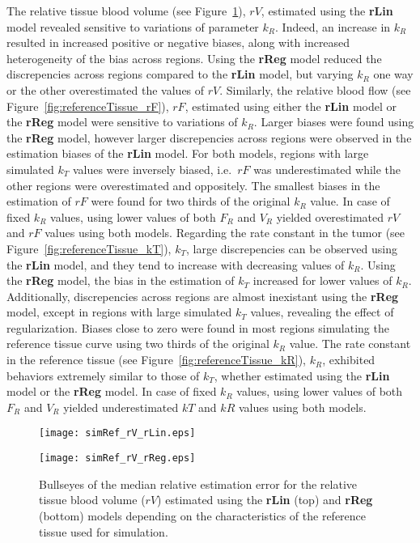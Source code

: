 The relative tissue blood volume (see Figure~\ref{fig:referenceTissue_rV}), $rV$, estimated using the \textbf{rLin} model revealed sensitive to variations of parameter $k_R$.
Indeed, an increase in $k_R$ resulted in increased positive or negative biases, along with increased heterogeneity of the bias across regions.
Using the \textbf{rReg} model reduced the discrepencies across regions compared to the \textbf{rLin} model, but varying $k_R$ one way or the other overestimated the values of $rV$.
Similarly, the relative blood flow (see Figure~\ref{fig:referenceTissue_rF}), $rF$, estimated using either the \textbf{rLin} model or the \textbf{rReg} model were sensitive to variations of $k_R$. 
Larger biases were found using the \textbf{rReg} model, however larger discrepencies across regions were observed in the estimation biases of the \textbf{rLin} model.
For both models, regions with large simulated $k_T$ values were inversely biased, i.e.~$rF$ was underestimated while the other regions were overestimated and oppositely.
The smallest biases in the estimation of $rF$ were found for two thirds of the original $k_R$ value.
In case of fixed $k_R$ values, using lower values of both $F_R$ and $V_R$ yielded overestimated $rV$ and $rF$ values using both models.
Regarding the rate constant in the tumor (see Figure~\ref{fig:referenceTissue_kT}), $k_T$, large discrepencies can be observed using the \textbf{rLin} model, and they tend to increase with decreasing values of $k_R$.
Using the \textbf{rReg} model, the bias in the estimation of $k_T$ increased for lower values of $k_R$.
Additionally, discrepencies across regions are almost inexistant using the \textbf{rReg} model, except in regions with large simulated $k_T$ values, revealing the effect of regularization.
Biases close to zero were found in most regions simulating the reference tissue curve using two thirds of the original $k_R$ value.
The rate constant in the reference tissue (see Figure~\ref{fig:referenceTissue_kR}), $k_R$, exhibited behaviors extremely similar to those of $k_T$, whether estimated using the \textbf{rLin} model or the \textbf{rReg} model.
In case of fixed $k_R$ values, using lower values of both $F_R$ and $V_R$ yielded underestimated $kT$ and $kR$ values using both models.


\begin{figure}
\texttt{[image: simRef\_rV\_rLin.eps]}
\par\vspace{1cm}
\texttt{[image: simRef\_rV\_rReg.eps]}
\caption{Bullseyes of the median relative estimation error for the relative tissue blood volume ($rV$) estimated using the \textbf{rLin} (top) and \textbf{rReg} (bottom) models depending on the characteristics of the reference tissue used for simulation.}
\label{fig:referenceTissue_rV}
\end{figure}

